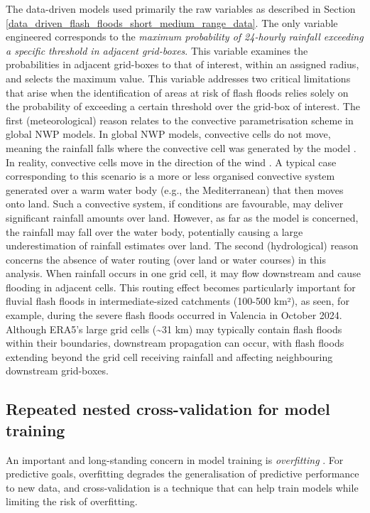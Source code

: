 The data-driven models used primarily the raw variables as described in Section \ref{data_driven_flash_floods_short_medium_range_data}. The only variable engineered corresponds to the \textit{maximum probability of 24-hourly rainfall exceeding a specific threshold in adjacent grid-boxes}. This variable examines the probabilities in adjacent grid-boxes to that of interest, within an assigned radius, and selects the maximum value. This variable addresses two critical limitations that arise when the identification of areas at risk of flash floods relies solely on the probability of exceeding a certain threshold over the grid-box of interest. The first (meteorological) reason relates to the convective parametrisation scheme in global NWP models. In global NWP models, convective cells do not move, meaning the rainfall falls where the convective cell was generated by the model \citep{Doswell_2001}. In reality, convective cells move in the direction of the wind \citep{Doswell_2001}. A typical case corresponding to this scenario is a more or less organised convective system generated over a warm water body (e.g., the Mediterranean) that then moves onto land. Such a convective system, if conditions are favourable, may deliver significant rainfall amounts over land. However, as far as the model is concerned, the rainfall may fall over the water body, potentially causing a large underestimation of rainfall estimates over land. The second (hydrological) reason concerns the absence of water routing (over land or water courses) in this analysis. When rainfall occurs in one grid cell, it may flow downstream and cause flooding in adjacent cells. This routing effect becomes particularly important for fluvial flash floods in intermediate-sized catchments (100-500 km²), as seen, for example, during the severe flash floods occurred in Valencia in October 2024. Although ERA5's large grid cells (\sim31 km) may typically contain flash floods within their boundaries, downstream propagation can occur, with flash floods extending beyond the grid cell receiving rainfall and affecting neighbouring downstream grid-boxes.


\subsection{Repeated nested cross-validation for model training}

An important and long-standing concern in model training is \textit{overfitting} \citep{Ying_2019}. For predictive goals, overfitting degrades the generalisation of predictive performance to new data, and cross-validation is a technique that can help train models while limiting the risk of overfitting. 


